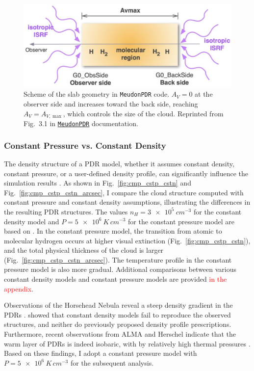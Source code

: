\documentclass[12pt,a4paper]{article}
\newcommand{\mdpdr}{\texttt{MeudonPDR} code}
\newcommand{\qt}[1]{\textcolor{red}{#1}}
\begin{document}
\begin{figure}
    \centering
    \includegraphics[width=.7\textwidth,keepaspectratio]{schemePDR.pdf}
    \caption{Scheme of the slab geometry in \mdpdr{}. $A_V = 0$ at the observer side and increases toward the back side, reaching $A_V = A_{V, \max}$, which controls the size of the cloud. Reprinted from Fig.~3.1 in \href{https://ism.obspm.fr/files/PDRDocumentation/PDRDoc7.pdf}{\texttt{MeudonPDR}} documentation.} \label{fig:1Dgeometry}
\end{figure}

\subsubsection{Constant Pressure vs. Constant Density} \label{sec:cstnp}

The density structure of a PDR model, whether it assumes constant density, constant pressure, or a user-defined density profile, can significantly influence the simulation results \parencite{Wolfire2022}. As shown in Fig.~\ref{fig:cmp_cstp_cstn} and Fig.~\ref{fig:cmp_cstp_cstn_arcsec}, I compare the cloud structure computed with constant pressure and constant density assumptions, illustrating the differences in the resulting PDR structures. The values $n_H = \qty{3e5}{cm^{-3}}$ for the constant density model and $P = \qty{5e6}{K\,cm^{-3}}$ for the constant pressure model are based on \textcite{Maillard2023}. In the constant pressure model, the transition from atomic to molecular hydrogen occurs at higher visual extinction (Fig.~\ref{fig:cmp_cstp_cstn}), and the total physical thickness of the cloud is larger (Fig.~\ref{fig:cmp_cstp_cstn_arcsec}). The temperature profile in the constant pressure model is also more gradual. Additional comparisons between various constant density models and constant pressure models are provided \qt{in the appendix}.

Observations of the Horsehead Nebula reveal a steep density gradient in the PDRs \parencite{Habart2005,Guzmán2011}. \textcite{HernándezVera2023} showed that constant density models fail to reproduce the observed structures, and neither do previously proposed density profile prescriptions. Furthermore, recent observations from ALMA and Herschel indicate that the warm layer of PDRs is indeed isobaric, with by relatively high thermal pressures \parencite{Marconi1998,Goicoechea2016,Joblin2018,Wu2018,Bron2018,Maillard2021}. Based on these findings, I adopt a constant pressure model with $P = \qty{5e6}{K\,cm^{-3}}$ for the subsequent analysis.
\end{document}
